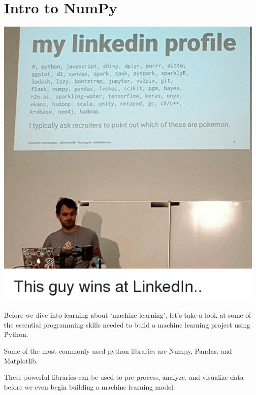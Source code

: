 \documentclass{42-en}
\begin{document}
\chapter{Intro to NumPy}

\centerline{\includegraphics[width=150mm]{images/too_much_linkedin.png}}

\raggedright{
Before we dive into learning about ‘machine learning’, let’s take a look at some of the essential programming skills needed to build a machine learning project using Python. 
}\linebreak

\raggedright{
Some of the most commonly used python libraries are Numpy, Pandas, and Matplotlib.
}\linebreak

\raggedright{
These powerful libraries can be used to pre-process, analyze, and visualize data before we even begin building a machine learning model.
}\linebreak
\end{document}
